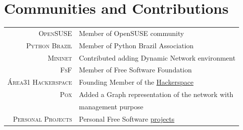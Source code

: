 \documentclass[a4paper,10pt]{article} %
\begin{document}

\section{Communities and Contributions}

\begin{tabular}{rl}
\textsc{OpenSUSE}  & Member of OpenSUSE community \\
\textsc{Python Brazil}  & Member of Python Brazil Association \\
\textsc{Mininet}  & Contributed adding Dynamic Network environment \\
\textsc{FsF} & Member of Free Software Foundation \\
\textsc{Área31 Hackerspace} & Founding Member of the
\href{http://area31.net.br}{Hackerspace} \\
\textsc{Pox} & Added a Graph representation of the network with
\\ & management purpose \\
\textsc{Personal Projects} & Personal Free Software
\href{http://github.com/pantuza}{projects} \\
\end{tabular}












\end{document}
